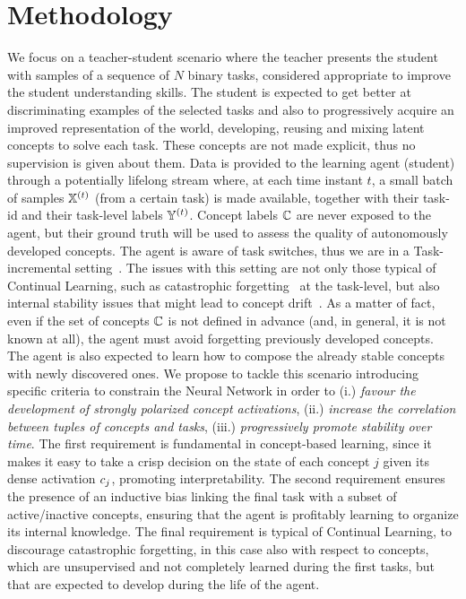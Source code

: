\section{Methodology}
\label{cem:sec:method}
We focus on a teacher-student scenario where the teacher presents the student with samples of a sequence of $N$ binary tasks, considered appropriate to improve the student understanding skills. %
The student is expected to get better at discriminating examples of the selected tasks and also to progressively acquire an improved representation of the world, developing, reusing and mixing latent concepts to solve each task. These concepts are not made explicit, thus no supervision is given about them.
Data is provided to the learning agent (student) through a potentially lifelong stream where, at each time instant $t$, a small batch of samples ${\mathbb{X}}^{(t)}$ (from a certain task) is made available, together with their task-id and their task-level labels ${\mathbb{Y}}^{(t)}$. Concept labels ${\mathbb{C}}$ are never exposed to the agent, but their ground truth will be used to assess the quality of autonomously developed concepts. 
The agent is aware of task switches, thus we are in a Task-incremental setting~\cite{van2022three}.
%
The issues with this setting are not only those typical of Continual Learning, such as catastrophic forgetting~\cite{parisi2019continual} at the task-level, but also internal stability issues that might lead to concept drift~\cite{marconato2023neuro}. As a matter of fact, even if the set of concepts ${\mathbb{C}}$ is not defined in advance (and, in general, it is not known at all), the agent must avoid forgetting previously developed concepts. %
The agent is also expected to learn how to compose the already stable concepts with newly discovered ones.
%
We propose to tackle this scenario introducing specific criteria to constrain the Neural Network in order to (i.) \textit{favour the development of %
strongly polarized concept activations}, (ii.) \textit{increase the correlation between tuples of concepts and tasks}, (iii.) \textit{progressively promote stability over time}. The first requirement is fundamental in concept-based learning, since it makes it easy to take a crisp decision on the state of each concept $j$ given its dense activation ${c}_j$, promoting interpretability. The second requirement ensures the presence of an inductive bias linking the final task with a subset of active/inactive concepts, ensuring that the agent is profitably learning to organize its internal knowledge. The final requirement is typical of Continual Learning, to discourage catastrophic forgetting, %
in this case also with respect to concepts, which are unsupervised and not completely learned during the first tasks, but that are expected to develop during the life of the agent.


